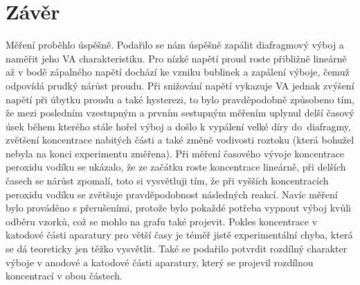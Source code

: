 \documentclass[12pt]{article}
\begin{document}
\section{Závěr}
Měření proběhlo úspěšně. Podařilo se nám úspěšně zapálit diafragmový výboj a naměřit jeho VA charakteristiku. Pro nízké napětí proud roste přibližně lineárně až v bodě zápalného napětí dochází ke vzniku bublinek a zapálení výboje, čemuž odpovídá prudký nárůst proudu. Při snižování napětí vykazuje VA jednak zvýšení napětí při úbytku proudu a také hysterezi, to bylo pravděpodobně způsobeno tím, že mezi posledním vzestupným a prvním sestupným měřením uplynul delší časový úsek během kterého stále hořel výboj a došlo k vypálení velké díry do~diafragmy, zvětšení koncentrace nabitých části a také změně vodivosti roztoku (která bohužel nebyla na konci experimentu změřena). Při měření časového vývoje koncentrace peroxidu vodíku se ukázalo, že ze začátku roste koncentrace lineárně, při delších časech se nárůst zpomalí, toto si vysvětluji tím, že při vyšších koncentracích peroxidu vodíku se zvětšuje pravděpodobnost následných reakcí. Navíc měření bylo prováděno s přerušeními, protože bylo pokaždé potřeba vypnout výboj kvůli odběru vzorků, což se mohlo na grafu také projevit. Pokles koncentrace v katodové části aparatury pro větší časy je téměř jistě experimentální chyba, která se dá teoreticky jen těžko vysvětlit. Také se podařilo potvrdit rozdílný charakter výboje v anodové a katodové části aparatury, který se projevil rozdílnou koncentrací  v obou částech.
\end{document}
